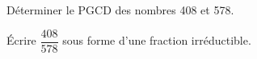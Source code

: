 \begin{myenumerate}
\item Déterminer le PGCD des nombres 408 et 578.
\item \'Ecrire $\dfrac{408}{578}$ sous forme d'une fraction irréductible.
\end{myenumerate}